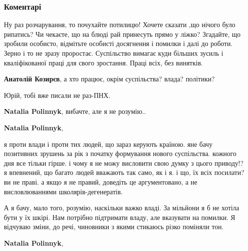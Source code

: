  
 
 
 
 
\subsubsection{Коментарі}
\label{sec:21_11_2014.fb.fb_group.patrioty_ukrainy.1.godovschina_evromaidan.cmt}

\begin{itemize} %

Ну раз розчарування, то почухайте потилицю! Хочете сказати ,що нічого було
рипатись? Чи чекаєте, що на блюді рай принесуть прямо у ліжко? Згадайте, що
зробили особисто, відмітьте особисті досягнення і помилки і далі до роботи.
Зерно і то не зразу проростає. Суспільство вимагає куди більших зусиль і
кваліфікованої праці для свого зростання. Праці всіх, без винятків.

\textbf{Анатолій Козирєв}, а хто працює, окрім суспільства? влада? політики?

Юрій, тобі вже писали не раз-ПНХ.

\textbf{Natalia Polinnyk}, вибачте, але я не розумію..

\textbf{Natalia Polinnyk}, 

я проти влади і проти тих людей, що зараз керують країною. яне бачу позитивних
зрушень за рік з початку формування нового суспільства. кожного дня все тільки
гірше. і чому я не можу висловити свою думку з цього приводу!? я впевнений, що
багато людей вважають так само, як і я. і що, їх всіх посилати? ви не праві. а
якщо я не правий, доведіть це аргументовано, а не висловлюваннями
школярів-дегенератів.


А я бачу, мало того, розумію, наскільки важко владі. За мільйони я б не хотіла бути
у їх шкірі. Нам потрібно підтримати владу, але вказувати на помилки. Я відчуваю
зміни, до речі, чиновники з якими стикаюсь різко поміняли тон.

\textbf{Natalia Polinnyk}, 


\end{itemize}
